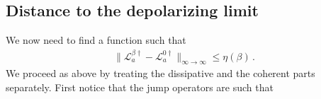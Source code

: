 \documentclass[aps,pra,amsmath,amssymb,twocolumn,10pt]{revtex4-2}
\theoremstyle{definition}
\newcommand{\norm}[1]{\left\|#1\right\|}
\newcommand{\alv}[1]{\textcolor{blue}{[alv] #1}}
\begin{document}

\subsection{Distance to the depolarizing limit}
We now need to find a function such that
\begin{align}
	\|\mathcal{L}_a^{\beta \dagger}-\mathcal{L}_{a}^{0 \dagger }\|_{\infty\to\infty}\le \eta(\beta)\,.\end{align}
We proceed as above by treating the dissipative and the coherent parts separately.
First notice that the jump operators are such that
\end{document}
